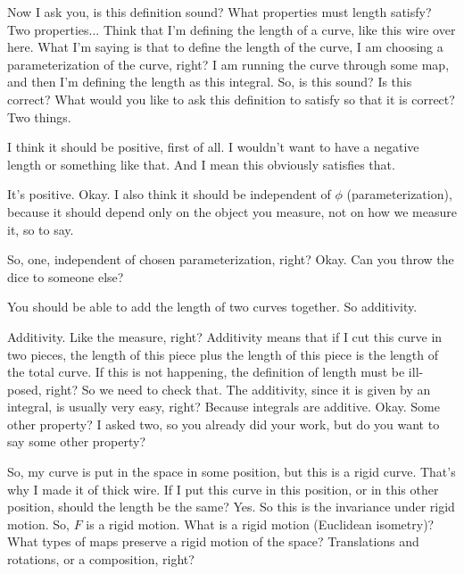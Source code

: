 \begin{spoken_clean}[00:12:03 - 00:13:03]
Now I ask you, is this definition sound? What properties must length satisfy? Two properties... Think that I'm defining the length of a curve, like this wire over here. What I'm saying is that to define the length of the curve, I am choosing a parameterization of the curve, right? I am running the curve through some map, and then I'm defining the length as this integral. So, is this sound? Is this correct? What would you like to ask this definition to satisfy so that it is correct? Two things.
\end{spoken_clean}

\begin{student_question}[Student 1]
I think it should be positive, first of all. I wouldn't want to have a negative length or something like that. And I mean this obviously satisfies that.
\end{student_question}

\begin{spoken_clean}[00:13:03 - 00:13:40]
It's positive. Okay. I also think it should be independent of $\phi$ (parameterization), because it should depend only on the object you measure, not on how we measure it, so to say.

So, one, independent of chosen parameterization, right? Okay. Can you throw the dice to someone else?
\end{spoken_clean}

\begin{student_question}[Student 2]
You should be able to add the length of two curves together. So additivity.
\end{student_question}

\begin{spoken_clean}[00:13:40 - 00:14:46]
Additivity. Like the measure, right? Additivity means that if I cut this curve in two pieces, the length of this piece plus the length of this piece is the length of the total curve. If this is not happening, the definition of length must be ill-posed, right? So we need to check that. The additivity, since it is given by an integral, is usually very easy, right? Because integrals are additive. Okay. Some other property? I asked two, so you already did your work, but do you want to say some other property?

So, my curve is put in the space in some position, but this is a rigid curve. That's why I made it of thick wire. If I put this curve in this position, or in this other position, should the length be the same? Yes. So this is the invariance under rigid motion. So, $F$ is a rigid motion. What is a rigid motion (Euclidean isometry)? What types of maps preserve a rigid motion of the space? Translations and rotations, or a composition, right?
\end{spoken_clean}


